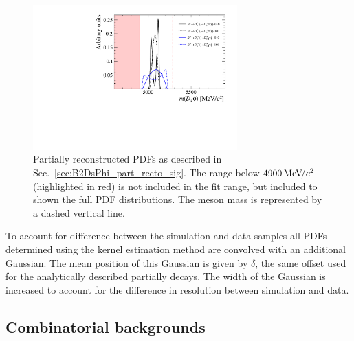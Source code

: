 

\begin{figure}[!h]
    \centering
    \includegraphics[width=0.70\textwidth]{figs/B2DsPhi/DsPhi_part_reco_Shapes.pdf}
    \caption{Partially reconstructed \decay{\Bp}{\Dssp\phiz} PDFs as described in Sec.~\ref{sec:B2DsPhi_part_recto_sig}. The range below $4900{\mathrm{\,Me\kern -0.1em V\!/}c^2}$ (highlighted in red) is not included in the fit range, but included to shown the full PDF distributions. The \Bp meson mass is represented by a dashed vertical line.}
    \label{fig:B2DsPhi_DsstPhi_partreco}   
\end{figure}





To account for difference between the simulation and data samples all PDFs determined using the kernel estimation method are convolved with an additional Gaussian. The mean position of this Gaussian is given by $\delta$, the same offset used for the analytically described partially decays. The width of the Gaussian is increased to account for the difference in resolution between simulation and data. 


\subsection{Combinatorial  backgrounds}
\label{sec:B2DsPhi_combcomps}

